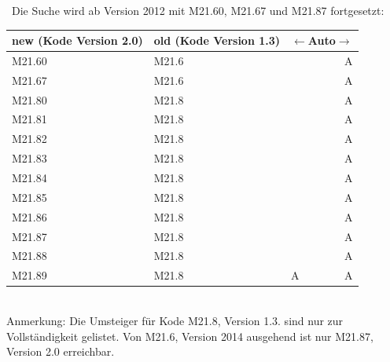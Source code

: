 \ \newline Die Suche wird ab Version 2012 mit M21.60, M21.67 und M21.87 fortgesetzt: 

\begin{centernss}
\renewcommand{\arraystretch}{1.2}
\begin{tabular}{p{136pt}p{136pt}lr}
new (Kode Version 2.0) & old (Kode Version 1.3) & \multicolumn{2}{c}{$\leftarrow$Auto$\rightarrow$} \\
\hline
M21.60 & M21.6 &  & A \\
M21.67 & M21.6 &  & A \\
M21.80 & M21.8 &  & A \\
M21.81 & M21.8 &  & A \\
M21.82 & M21.8 &  & A \\
M21.83 & M21.8 &  & A \\
M21.84 & M21.8 &  & A \\
M21.85 & M21.8 &  & A \\
M21.86 & M21.8 &  & A \\
M21.87 & M21.8 &  & A \\
M21.88 & M21.8 &  & A \\
M21.89 & M21.8 & A & A \\
\end{tabular}
\end{centernss}

\ \\


Anmerkung: Die Umsteiger für Kode M21.8, Version 1.3. sind nur zur Vollständigkeit gelistet. Von M21.6, Version 2014 ausgehend ist nur M21.87, Version 2.0 erreichbar.

